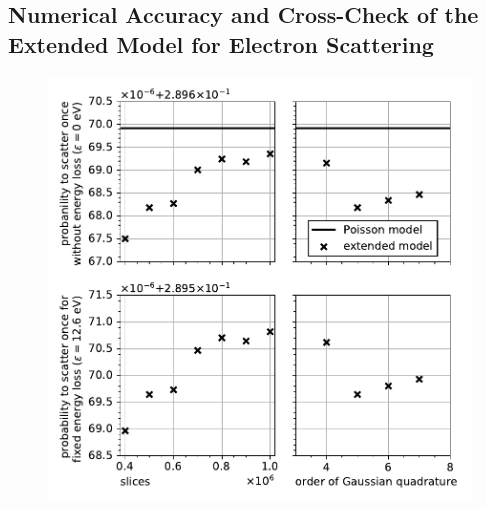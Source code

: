 \subsection{Numerical Accuracy and Cross-Check of the Extended Model for Electron Scattering}
\label{sec:eDepScatCrossSecExtendedModelNumEval}
\begin{figure}[t]
	\centering
	\includegraphics{chapter/energyDependentCrossSec/fig/scatProb1_numericalAccuracy.pdf}

\end{figure}
